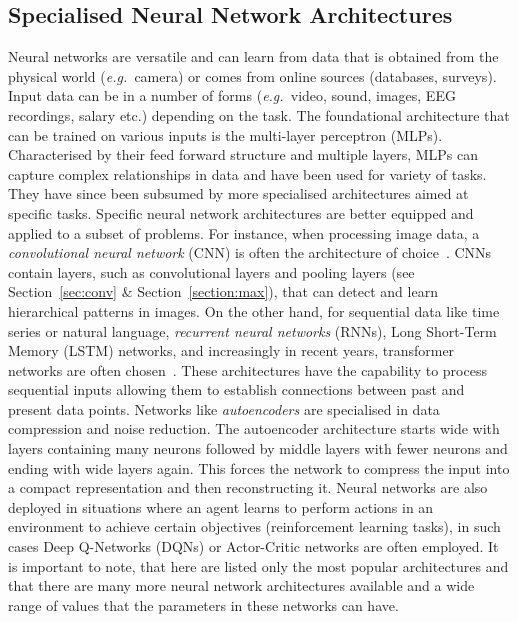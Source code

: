 \subsection{Specialised Neural Network Architectures}
Neural networks are versatile and can learn from data that is obtained from the physical world (\textit{e.g.\ }camera) or comes from online sources (\eg databases, surveys). Input data can be in a number of forms (\textit{e.g.\ }video, sound, images, EEG recordings, salary etc.) depending on the task. The foundational architecture that can be trained on various inputs is the multi-layer perceptron (MLPs). Characterised by their feed forward structure and multiple layers, MLPs can capture complex relationships in data and have been used for variety of tasks. They have since been subsumed by more specialised architectures aimed at specific tasks. Specific neural network architectures are better equipped and applied to a subset of problems. For instance, when processing image data, a \textit{convolutional neural network} (CNN) is often the architecture of choice~\cite{egmont2002image}. CNNs contain layers, such as convolutional layers and pooling layers (see Section~\ref{sec:conv} \& Section~\ref{section:max}), that can detect and learn hierarchical patterns in images. On the other hand, for sequential data like time series or natural language, \textit{recurrent neural networks} (RNNs), Long Short-Term Memory (LSTM) networks, and increasingly in recent years, transformer networks are often chosen~\cite{husken2003recurrent, langkvist2014review, zhou2021informer}. These architectures have the capability to process sequential inputs allowing them to establish connections between past and present data points. Networks like \textit{autoencoders} are specialised in data compression and noise reduction. The autoencoder architecture starts wide with layers containing many neurons followed by middle layers with fewer neurons and ending with wide layers again. This forces the network to compress the input into a compact representation and then reconstructing it. Neural networks are also deployed in situations where an agent learns to perform actions in an environment to achieve certain objectives (\ie reinforcement learning tasks), in such cases Deep Q-Networks (DQNs) or Actor-Critic networks are often employed. It is important to note, that here are listed only the most popular architectures and that there are many more neural network architectures available and a wide range of values that the parameters in these networks can have.



